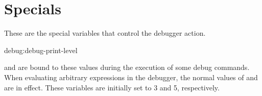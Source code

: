 %   
%   
%   
% 
%   
% 
%   


\section{Specials}
These are the special variables that control the debugger action.

\begin{defvar}{debug:}{debug-print-level}
  
   and  are bound to these
  values during the execution of some debug commands.  When evaluating
  arbitrary expressions in the debugger, the normal values of
   and  are in effect.  These
  variables are initially set to 3 and 5, respectively.
\end{defvar}
